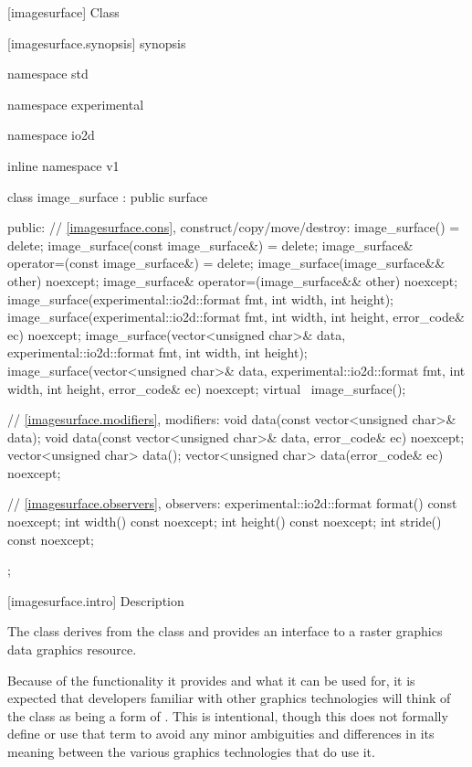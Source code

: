 [imagesurface] {Class }

 [imagesurface.synopsis] { synopsis}

\begin{codeblock}
namespace std { namespace experimental { namespace io2d { inline namespace v1 {
  class image_surface : public surface {
  public:
    // \ref{imagesurface.cons}, construct/copy/move/destroy:
    image_surface() = delete;
    image_surface(const image_surface&) = delete;
    image_surface& operator=(const image_surface&) = delete;
    image_surface(image_surface&& other) noexcept;
    image_surface& operator=(image_surface&& other) noexcept;
    image_surface(experimental::io2d::format fmt, int width, int height);
    image_surface(experimental::io2d::format fmt, int width, int height, 
      error_code& ec) noexcept;
    image_surface(vector<unsigned char>& data, experimental::io2d::format fmt,
      int width, int height);
    image_surface(vector<unsigned char>& data, experimental::io2d::format fmt,
      int width, int height, error_code& ec) noexcept;
    virtual ~image_surface();
    
    // \ref{imagesurface.modifiers}, modifiers:
    void data(const vector<unsigned char>& data);
    void data(const vector<unsigned char>& data, error_code& ec) noexcept;
    vector<unsigned char> data();
    vector<unsigned char> data(error_code& ec) noexcept;
    
    // \ref{imagesurface.observers}, observers:
    experimental::io2d::format format() const noexcept;
    int width() const noexcept;
    int height() const noexcept;
    int stride() const noexcept;
  };
} } } }
\end{codeblock}

 [imagesurface.intro] { Description}

\pnum
{}
The class  derives from the  class and provides an interface to a raster graphics data graphics resource.

\pnum
\enternote
Because of the functionality it provides and what it can be used for, it is expected that developers familiar with other graphics technologies will think of the  class as being a form of . This is intentional, though this \documenttypename{} does not formally define or use that term to avoid any minor ambiguities and differences in its meaning between the various graphics technologies that do use it.
\exitnote

